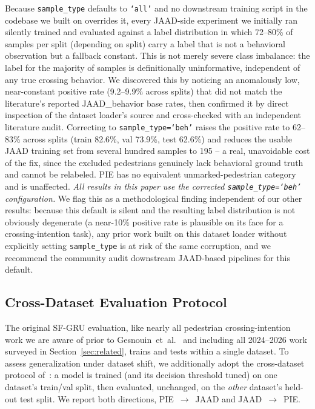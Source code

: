 Because \texttt{sample\_type} defaults to \texttt{`all'} and no
downstream training script in the codebase we built on overrides it, every
JAAD-side experiment we initially ran silently trained and evaluated
against a label distribution in which 72--80\% of samples per split
(depending on split) carry a label that is not a behavioral observation
but a fallback constant. This is not merely severe class imbalance: the
label for the majority of samples is definitionally uninformative,
independent of any true crossing behavior. We discovered this by
noticing an anomalously low, near-constant positive rate (9.2--9.9\%
across splits) that did not match the literature's reported
JAAD\_behavior base rates, then confirmed it by direct inspection of the
dataset loader's source and cross-checked with an independent
literature audit. Correcting to \texttt{sample\_type=`beh'} raises the
positive rate to 62--83\% across splits (train 82.6\%, val 73.9\%, test
62.6\%) and reduces the usable JAAD training set from several hundred
samples to 195 -- a real, unavoidable cost of the fix, since the
excluded pedestrians genuinely lack behavioral ground truth and cannot
be relabeled. PIE has no equivalent unmarked-pedestrian category and is
unaffected. \emph{All results in this paper use the corrected
\texttt{sample\_type=`beh'} configuration.} We flag this as a
methodological finding independent of our other results: because this
default is silent and the resulting label distribution is not
obviously degenerate (a near-10\% positive rate is plausible on its
face for a crossing-intention task), any prior work built on this
dataset loader without explicitly setting \texttt{sample\_type} is at
risk of the same corruption, and we recommend the community audit
downstream JAAD-based pipelines for this default.

\subsection{Cross-Dataset Evaluation Protocol}
\label{sec:method-crossprotocol}

The original SF-GRU evaluation, like nearly all pedestrian
crossing-intention work we are aware of prior to
Gesnouin~et~al.~\cite{gesnouin2022} and including all 2024--2026 work
surveyed in Section~\ref{sec:related}, trains and tests within a single
dataset. To assess generalization under dataset shift, we additionally
adopt the cross-dataset protocol of~\cite{gesnouin2022}: a model is
trained (and its decision threshold tuned) on one dataset's train/val
split, then evaluated, unchanged, on the \emph{other} dataset's held-out
test split. We report both directions, PIE~$\to$~JAAD and
JAAD~$\to$~PIE.

